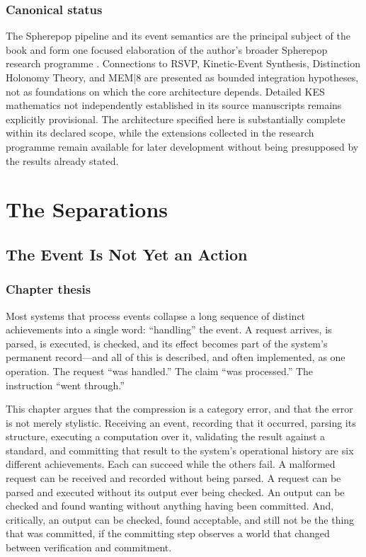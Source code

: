 \documentclass[11pt,openany]{book}
\begin{document}
\section*{Canonical status}

The Spherepop pipeline and its event semantics are the principal subject of
the book and form one focused elaboration of the author's broader
Spherepop research programme \cite{flyxion-spherepop}. Connections to RSVP,
Kinetic-Event Synthesis, Distinction
Holonomy Theory, and MEM|8 are presented as bounded integration hypotheses,
not as foundations on which the core architecture depends. Detailed KES
mathematics not independently established in its source manuscripts remains
explicitly provisional. The architecture specified here is substantially
complete within its declared scope, while the extensions collected in the
research programme remain available for later development without being
presupposed by the results already stated.

\tableofcontents

\mainmatter

\part{The Separations}

\chapter{The Event Is Not Yet an Action}
\section{Chapter thesis}
Most systems that process events collapse a long sequence of distinct
achievements into a single word: ``handling'' the event. A request arrives, is
parsed, is executed, is checked, and its effect becomes part of the system's
permanent record---and all of this is described, and often implemented, as one
operation. The request ``was handled.'' The claim ``was processed.'' The
instruction ``went through.''

This chapter argues that the compression is a category error, and that the
error is not merely stylistic. Receiving an event, recording that it occurred,
parsing its structure, executing a computation over it, validating the result
against a standard, and committing that result to the system's operational
history are six different achievements. Each can succeed while the others
fail. A malformed request can be received and recorded without being parsed. A
request can be parsed and executed without its output ever being checked. An
output can be checked and found wanting without anything having been
committed. And, critically, an output can be checked, found acceptable, and
still not be the thing that was committed, if the committing step observes a
world that changed between verification and commitment.
\end{document}

